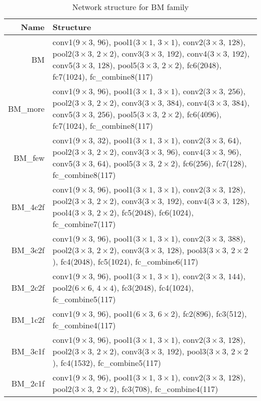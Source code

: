 \begin{table}[h]
\caption{Network structure for BM family} %
\centering %
\begin{tabularx}{\textwidth}{r|X}
\hline\hline
Name & Structure \\ [0.5ex]
\hline
BM & conv1($9\times3$, $96$), pool1($3\times1$, $3\times1$), conv2($3\times3$, $128$), pool2($3\times3$, $2\times2$), conv3($3\times3$, $192$), conv4($3\times3$, $192$), conv5($3\times3$, $128$), pool5($3\times3$, $2\times2$), fc6(2048), fc7(1024), fc\_combine8(117)\\
\hline
BM\_more & conv1($9\times3$, $96$), pool1($3\times1$, $3\times1$), conv2($3\times3$, $256$), pool2($3\times3$, $2\times2$), conv3($3\times3$, $384$), conv4($3\times3$, $384$), conv5($3\times3$, $256$), pool5($3\times3$, $2\times2$), fc6(4096), fc7(1024), fc\_combine8(117)\\
\hline
BM\_few & conv1($9\times3$, $32$), pool1($3\times1$, $3\times1$), conv2($3\times3$, $64$), pool2($3\times3$, $2\times2$), conv3($3\times3$, $96$), conv4($3\times3$, $96$), conv5($3\times3$, $64$), pool5($3\times3$, $2\times2$), fc6(256), fc7(128), fc\_combine8(117) \\
\hline
BM\_4c2f & conv1($9\times3$, $96$), pool1($3\times1$, $3\times1$), conv2($3\times3$, $128$), pool2($3\times3$, $2\times2$), conv3($3\times3$, $192$), conv4($3\times3$, $128$), pool4($3\times3$, $2\times2$), fc5(2048), fc6(1024), fc\_combine7(117)\\
\hline
BM\_3c2f & conv1($9\times3$, $96$), pool1($3\times1$, $3\times1$), conv2($3\times3$, $388$), pool2($3\times3$, $2\times2$), conv3($3\times3$, $128$), pool3($3\times3$, $2\times2$), fc4(2048), fc5(1024), fc\_combine6(117)\\
\hline
BM\_2c2f & conv1($9\times3$, $96$), pool1($3\times1$, $3\times1$), conv2($3\times3$, $144$), pool2($6\times6$, $4\times4$), fc3(2048), fc4(1024), fc\_combine5(117)\\
\hline
BM\_1c2f & conv1($9\times3$, $96$), pool1($6\times3$, $6\times2$), fc2(896), fc3(512), fc\_combine4(117)\\
\hline
BM\_3c1f & conv1($9\times3$, $96$), pool1($3\times1$, $3\times1$), conv2($3\times3$, $128$), pool2($3\times3$, $2\times2$), conv3($3\times3$, $192$), pool3($3\times3$, $2\times2$), fc4(1532), fc\_combine5(117)\\
\hline
BM\_2c1f & conv1($9\times3$, $96$), pool1($3\times1$, $3\times1$), conv2($3\times3$, $128$), pool2($3\times3$, $2\times2$), fc3(708), fc\_combine4(117)\\

\end{tabularx}
\end{table}
